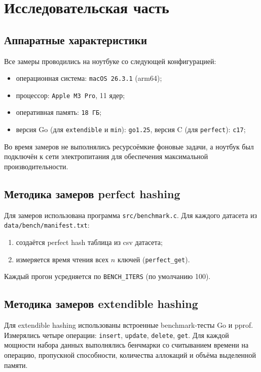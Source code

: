 \documentclass{itmo}
\begin{document}
\chapter{Исследовательская часть}

\section{Аппаратные характеристики}

Все замеры проводились на ноутбуке со следующей конфигурацией:
\begin{itemize}
	\item операционная система: \texttt{macOS 26.3.1} (arm64);
	\item процессор: \texttt{Apple M3 Pro}, 11 ядер;
	\item оперативная память: \texttt{18 ГБ};
	\item версия Go (для \texttt{extendible} и \texttt{min}): \texttt{go1.25}, версия C (для \texttt{perfect}): \texttt{с17};
\end{itemize}
Во время замеров не выполнялись ресурсоёмкие фоновые задачи, а ноутбук был подключён к сети электропитания для обеспечения максимальной производительности.

\section{Методика замеров perfect hashing}

Для замеров использована программа \texttt{src/benchmark.c}.
Для каждого датасета из \texttt{data/bench/manifest.txt}:
\begin{enumerate}
	\item создаётся perfect hash таблица из csv датасета;
	\item измеряется время чтения всех $n$ ключей (\texttt{perfect\_get}).
\end{enumerate}
Каждый прогон усредняется по \texttt{BENCH\_ITERS} (по умолчанию 100).

\section{Методика замеров extendible hashing}

Для extendible hashing использованы встроенные benchmark-тесты Go и pprof.
Измерялись четыре операции: \texttt{insert}, \texttt{update}, \texttt{delete}, \texttt{get}.
Для каждой мощности набора данных выполнялись бенчмарки со считыванием времени на операцию, пропускной способности, количества аллокаций и объёма выделенной памяти.
\end{document}
